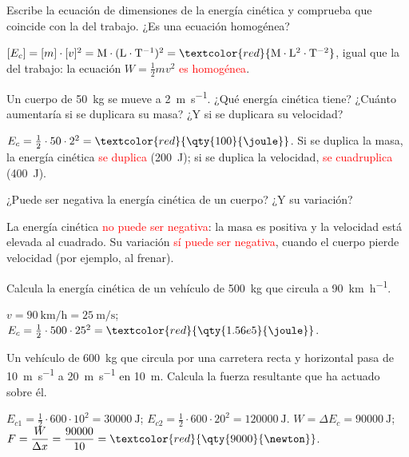 \begin{exercise}
    Escribe la ecuación de dimensiones de la energía cinética y comprueba que coincide con la del trabajo. ¿Es una ecuación homogénea?
    \begin{solu}
        \([E_c] = [m] \cdot [v]^2 = \mathrm{M} \cdot (\mathrm{L \cdot T^{-1}})^2 = \textcolor{red}{\mathrm{M \cdot L^2 \cdot T^{-2}}}\), igual que la del trabajo: la ecuación \(W = \frac{1}{2} m v^2\) \textcolor{red}{es homogénea}.
    \end{solu}
\end{exercise}

\begin{exercise}
    Un cuerpo de \qty{50}{\kg} se mueve a \qty{2}{\m\per\s}. ¿Qué energía cinética tiene? ¿Cuánto aumentaría si se duplicara su masa? ¿Y si se duplicara su velocidad?
    \begin{solu}
        \(E_c = \frac{1}{2} \cdot 50 \cdot 2^2 = \textcolor{red}{\qty{100}{\joule}}\). Si se duplica la masa, la energía cinética \textcolor{red}{se duplica} (\qty{200}{\joule}); si se duplica la velocidad, \textcolor{red}{se cuadruplica} (\qty{400}{\joule}).
    \end{solu}
\end{exercise}

\begin{exercise}
    ¿Puede ser negativa la energía cinética de un cuerpo? ¿Y su variación?
    \begin{solu}
        La energía cinética \textcolor{red}{no puede ser negativa}: la masa es positiva y la velocidad está elevada al cuadrado. Su variación \textcolor{red}{sí puede ser negativa}, cuando el cuerpo pierde velocidad (por ejemplo, al frenar).
    \end{solu}
\end{exercise}

\begin{exercise}
    Calcula la energía cinética de un vehículo de \qty{500}{\kg} que circula a \qty{90}{\km\per\hour}.
    \begin{solu}
        \(v = \qty{90}{\km\per\hour} = \qty{25}{\m\per\s}\); \(E_c = \frac{1}{2} \cdot 500 \cdot 25^2 = \textcolor{red}{\qty{1.56e5}{\joule}}\).
    \end{solu}
\end{exercise}

\begin{exercise}
    Un vehículo de \qty{600}{\kg} que circula por una carretera recta y horizontal pasa de \qty{10}{\m\per\s} a \qty{20}{\m\per\s} en \qty{10}{\m}. Calcula la fuerza resultante que ha actuado sobre él.
    \begin{solu}
        \(E_{c1} = \frac{1}{2} \cdot 600 \cdot 10^2 = \qty{30000}{\joule}\); \(E_{c2} = \frac{1}{2} \cdot 600 \cdot 20^2 = \qty{120000}{\joule}\).
        \(W = \Delta E_c = \qty{90000}{\joule}\); \(F = \dfrac{W}{\Delta x} = \dfrac{90000}{10} = \textcolor{red}{\qty{9000}{\newton}}\).
    \end{solu}
\end{exercise}


